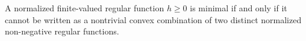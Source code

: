 A normalized finite-valued regular function $h \geq 0$ is minimal if and only if it cannot be written as a nontrivial convex combination of two distinct normalized non-negative regular functions.
